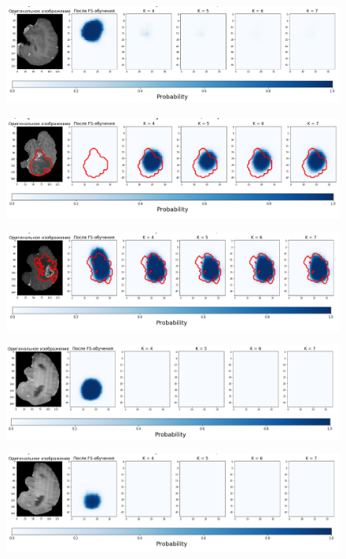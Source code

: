 \begin{figure}[h!] 
  \center
  \includegraphics [scale=0.7] {images/good_15.png}
\end{figure}


\begin{figure}[h!] 
  \center
  \includegraphics [scale=0.7] {images/good_16.png}
\end{figure}


\begin{figure}[h!] 
  \center
  \includegraphics [scale=0.7] {images/good_17.png}
 \end{figure} 
  
  \begin{figure}[h!] 
  \center
  \includegraphics [scale=0.7] {images/good_18.png}
  \end{figure} 
  
  \begin{figure}[h!] 
  \center
  \includegraphics [scale=0.7] {images/good_19.png}
\end{figure}


